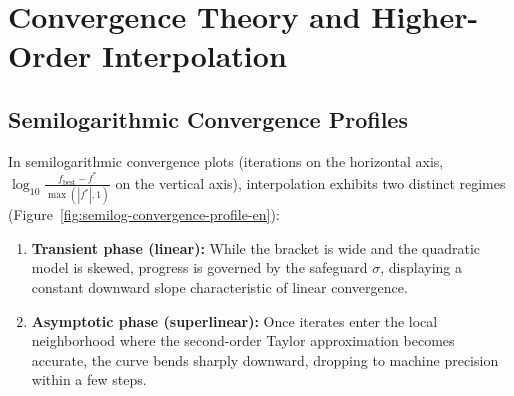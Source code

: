 \FloatBarrier
\section{Convergence Theory and Higher-Order Interpolation}
\label{sec:univariate-convergence-theory-en}

\subsection{Semilogarithmic Convergence Profiles}
In semilogarithmic convergence plots (iterations on the horizontal axis, $\log_{10} \frac{f_{\text{best}} - f^*}{\max(|f^*|, 1)}$ on the vertical axis), interpolation exhibits two distinct regimes (Figure~\ref{fig:semilog-convergence-profile-en}):
\begin{enumerate}
    \item \textbf{Transient phase (linear):} While the bracket is wide and the quadratic model is skewed, progress is governed by the safeguard $\sigma$, displaying a constant downward slope characteristic of linear convergence.
    \item \textbf{Asymptotic phase (superlinear):} Once iterates enter the local neighborhood where the second-order Taylor approximation becomes accurate, the curve bends sharply downward, dropping to machine precision within a few steps.
\end{enumerate}

